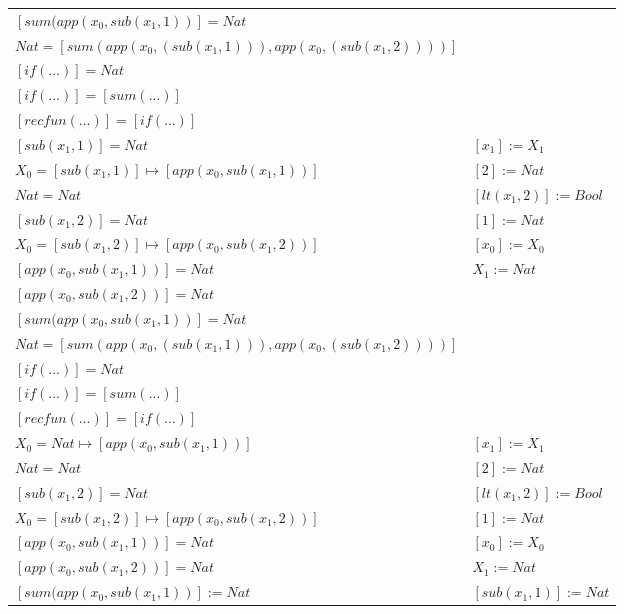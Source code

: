 \begin{exercise}
\begin{description}
\begin{center}
\begin{longtable}{ | l | l | }
                        $[sum(app(x_0, sub(x_1,1))] = Nat$ & \\
                        $Nat = [sum(app(x_0, (sub(x_1,1))), app(x_0, (sub(x_1,2))))]$ & \\
                        $[if(...)] = Nat$ & \\
                        $[if(...)] = [sum(...)]$ & \\
                        $[recfun(...)] =  [if(...)]$ & \\
                    \hline 
                        $[sub(x_1,1)] = Nat$ &  $[x_1] := X_1$ \\
                        $X_0 = [sub(x_1,1)] \mapsto [app(x_0, sub(x_1,1))]$ & $[2] := Nat$ \\
                        $Nat = Nat$ & $[lt(x_1 , 2)] := Bool$ \\
                        $[sub(x_1,2)] = Nat$ & $[1] := Nat$ \\
                        $X_0 = [sub(x_1,2)] \mapsto [app(x_0, sub(x_1,2))]$ & $[x_0] := X_0$  \\
                        $[app(x_0, sub(x_1,1))] = Nat$ & $X_1 := Nat$\\
                        $[app(x_0, sub(x_1,2))] = Nat$ & \\
                        $[sum(app(x_0, sub(x_1,1))] = Nat$ & \\
                        $Nat = [sum(app(x_0, (sub(x_1,1))), app(x_0, (sub(x_1,2))))]$ & \\
                        $[if(...)] = Nat$ & \\
                        $[if(...)] = [sum(...)]$ & \\
                        $[recfun(...)] = [if(...)]$ & \\
                    \hline
                        $X_0 = Nat \mapsto [app(x_0, sub(x_1,1))]$ &   $[x_1] := X_1$ \\
                        $Nat = Nat$ & $[2] := Nat$ \\
                        $[sub(x_1,2)] = Nat$ & $[lt(x_1 , 2)] := Bool$ \\
                        $X_0 = [sub(x_1,2)] \mapsto [app(x_0, sub(x_1,2))]$ &  $[1] := Nat$ \\
                        $[app(x_0, sub(x_1,1))] = Nat$ & $[x_0] := X_0$ \\
                        $[app(x_0, sub(x_1,2))] = Nat$ & $X_1 := Nat$ \\
                        $[sum(app(x_0, sub(x_1,1))] := Nat$ & $[sub(x_1,1)] := Nat$ \\

\end{longtable}
\end{center}
\end{description}
\end{exercise}

